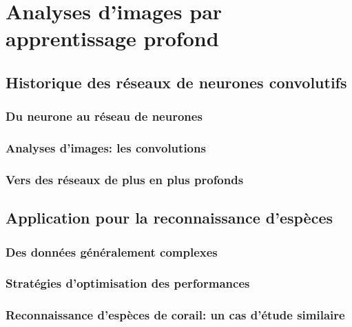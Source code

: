 \newpage

\section{Analyses d'images par apprentissage profond}
\subsection{Historique des réseaux de neurones convolutifs}
\subsubsection{Du neurone au réseau de neurones}
\subsubsection{Analyses d'images: les convolutions}
\subsubsection{Vers des réseaux de plus en plus profonds}

\newpage

\subsection{Application pour la reconnaissance d'espèces}
\subsubsection{Des données généralement complexes}

\small



\normalsize

\subsubsection{Stratégies d'optimisation des performances}
\subsubsection{Reconnaissance d'espèces de corail: un cas d'étude similaire}

